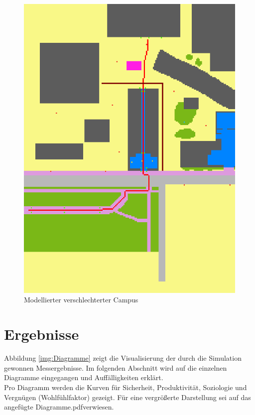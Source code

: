 \documentclass[10pt]{scrartcl}
\begin{document}
	\begin{figure}[H]
                \includegraphics[width=\textwidth]{Verschlechterung}
        \caption{Modellierter verschlechterter Campus}
        \label{img:Verschlechterung}
	\end{figure}  

\section{Ergebnisse}\label{sec:Ergebnisse}
Abbildung \ref{img:Diagramme} zeigt die Visualisierung der durch die Simulation gewonnen Messergebnisse. Im folgenden Abschnitt wird auf die einzelnen Diagramme eingegangen und Auffälligkeiten erklärt.\\
Pro Diagramm werden die Kurven für Sicherheit, Produktivität, Soziologie und Vergnügen (Wohlfühlfaktor) gezeigt. Für eine vergrößerte Darstellung sei auf das angefügte \glqq Diagramme.pdf\grqq verwiesen.
\end{document}
